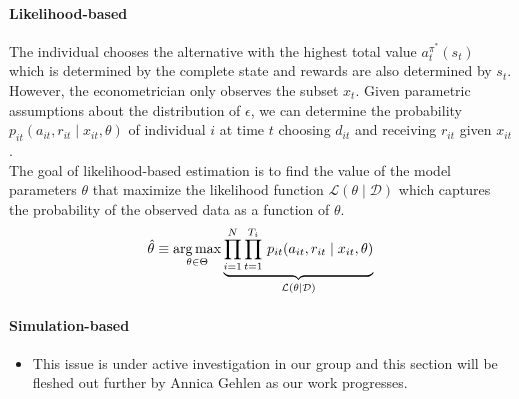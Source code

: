 \paragraph{Likelihood-based} The individual chooses the alternative with the highest total value $a_t^{\pi^*}(s_t)$ which is determined by the complete state and rewards are also determined by $s_t$. However, the econometrician only observes the subset $x_t$. Given parametric assumptions about the distribution of $\epsilon$, we can determine the probability $p_{it}(a_{it}, r_{it} \mid x_{it}, \theta)$ of individual $i$ at time $t$ choosing $d_{it}$ and receiving $r_{it}$ given $x_{it}$.\\

\noindent The goal of likelihood-based estimation is to find the value of the model parameters $\theta$ that maximize the likelihood function $\mathcal{L}(\theta\mid\mathcal{D})$ which captures the probability of the observed data as a function of $\theta$.
%
\begin{align*}
  \hat{\theta} \equiv \operatorname*{arg\,max}_{\theta \in \Theta}  \underbrace{\prod^N_{i= 1} \prod^{T_i}_{t= 1}\, p_{it}(a_{it}, r_{it} \mid x_{it}, \theta)}_{\mathcal{L}(\theta\mid\mathcal{D})}
\end{align*}

\paragraph{Simulation-based}

\begin{itemize}
  \item This issue is under active investigation in our group and this section will be fleshed out further by Annica Gehlen as our work progresses.
\end{itemize}
